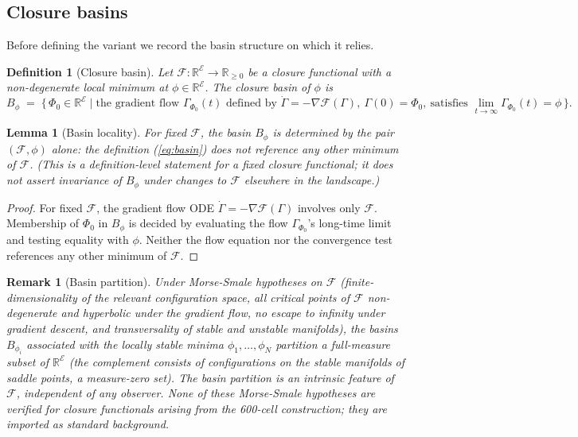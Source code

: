 \documentclass[12pt]{article}
\newtheorem{definition}[theorem]{Definition}
\newtheorem{remark}[theorem]{Remark}
\newtheorem{lemma}[theorem]{Lemma}
\newcommand{\Ecal}{\mathcal{E}}
\newcommand{\Fcal}{\mathcal{F}}
\begin{document}
\subsection{Closure basins}\label{subsec:basins}

Before defining the variant we record the basin structure on which it relies.

\begin{definition}[Closure basin]\label{def:basin}
Let $\Fcal: \mathbb{R}^\Ecal \to \mathbb{R}_{\geq 0}$ be a closure functional with a non-degenerate local minimum at $\phi \in \mathbb{R}^\Ecal$. The \emph{closure basin of $\phi$} is
\begin{equation}\label{eq:basin}
    B_\phi \;=\; \bigl\{\, \Phi_0 \in \mathbb{R}^\Ecal \;\big|\; \text{the gradient flow }\Gamma_{\Phi_0}(t)\text{ defined by }\dot\Gamma = -\nabla\Fcal(\Gamma),\ \Gamma(0) = \Phi_0,\ \text{satisfies }\lim_{t\to\infty} \Gamma_{\Phi_0}(t) = \phi \,\bigr\}.
\end{equation}
\end{definition}

\begin{lemma}[Basin locality]\label{lem:basin_locality}
For fixed $\Fcal$, the basin $B_\phi$ is determined by the pair $(\Fcal, \phi)$ alone: the definition (\ref{eq:basin}) does not reference any other minimum of $\Fcal$. (This is a definition-level statement for a fixed closure functional; it does not assert invariance of $B_\phi$ under changes to $\Fcal$ elsewhere in the landscape.)
\end{lemma}

\begin{proof}
For fixed $\Fcal$, the gradient flow ODE $\dot\Gamma = -\nabla\Fcal(\Gamma)$ involves only $\Fcal$. Membership of $\Phi_0$ in $B_\phi$ is decided by evaluating the flow $\Gamma_{\Phi_0}$'s long-time limit and testing equality with $\phi$. Neither the flow equation nor the convergence test references any other minimum of $\Fcal$.
\end{proof}

\begin{remark}[Basin partition]\label{rem:partition}
Under Morse-Smale hypotheses on $\Fcal$ (finite-dimensionality of the relevant configuration space, all critical points of $\Fcal$ non-degenerate and hyperbolic under the gradient flow, no escape to infinity under gradient descent, and transversality of stable and unstable manifolds), the basins $B_{\phi_i}$ associated with the locally stable minima $\phi_1, \ldots, \phi_N$ partition a full-measure subset of $\mathbb{R}^\Ecal$ (the complement consists of configurations on the stable manifolds of saddle points, a measure-zero set). The basin partition is an intrinsic feature of $\Fcal$, independent of any observer. None of these Morse-Smale hypotheses are verified for closure functionals arising from the 600-cell construction; they are imported as standard background.
\end{remark}
\end{document}
